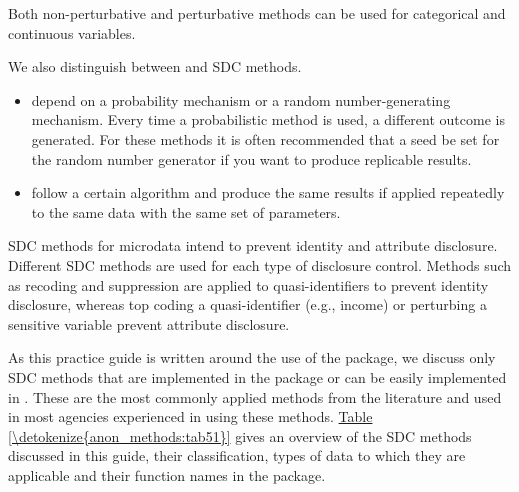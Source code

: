 \documentclass[letterpaper,10pt,english]{sphinxmanual}
\begin{document}
Both non-perturbative and perturbative methods can be used for
categorical and continuous variables.

We also distinguish between  and  SDC
methods.
\begin{itemize}
\item {} 
 depend on a probability mechanism or a
random number-generating mechanism. Every time a probabilistic method
is used, a different outcome is generated. For these methods it is
often recommended that a seed be set for the random number generator
if you want to produce replicable results.

\item {} 
 follow a certain algorithm and produce the
same results if applied repeatedly to the same data with the same set
of parameters.

\end{itemize}

SDC methods for microdata intend to prevent identity and attribute
disclosure. Different SDC methods are used for each type of disclosure
control. Methods such as recoding and suppression are applied to
quasi-identifiers to prevent identity disclosure, whereas top coding a
quasi-identifier (e.g., income) or perturbing a sensitive variable
prevent attribute disclosure.

As this practice guide is written around the use of the 
package, we discuss only SDC methods that are implemented in the
 package or can be easily implemented in . These are the
most commonly applied methods from the literature and used in most
agencies experienced in using these methods. \hyperref[\detokenize{anon_methods:tab51}]{Table \ref{\detokenize{anon_methods:tab51}}} gives an overview
of the SDC methods discussed in this guide, their classification,
types of data to which they are applicable and their function names in
the  package.
\end{document}
